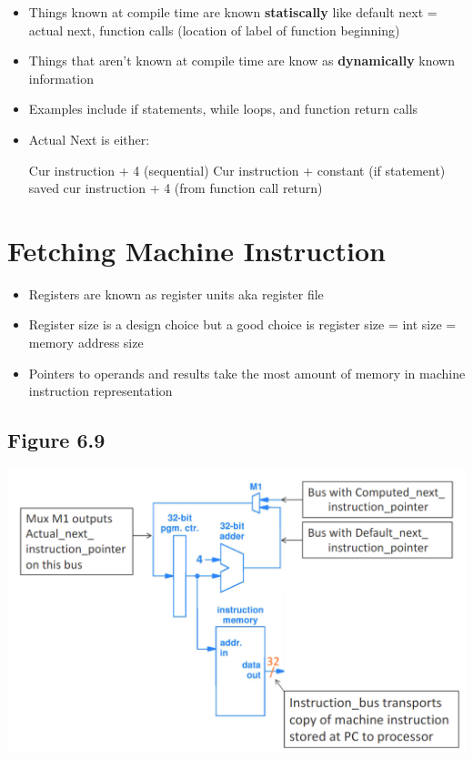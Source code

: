 \documentclass{article}
\begin{document}
 \begin{itemize}
     \item Things known at compile time are known \textbf{statiscally} like default next = actual next, function calls (location of label of function beginning)
     
     \item Things that aren't known at compile time are know as \textbf{dynamically} known information
     
     \item Examples include if statements, while loops, and function return calls
     
     \item Actual Next is either:
     
     Cur instruction + 4 (sequential)
     Cur instruction + constant (if statement)
     saved cur instruction + 4 (from function call return)
     
 \end{itemize}
 
 \section{Fetching Machine Instruction}
 
 \begin{itemize}
     \item Registers are known as register units aka register file
     
     \item Register size is a design choice but a good choice is register size = int size = memory address size
     
     \item Pointers to operands and results take the most amount of memory in machine instruction representation
 \end{itemize}
 
 \subsection{Figure 6.9}
 \includegraphics[scale=0.35]{images/6.9 pt 1.png}
\end{document}
